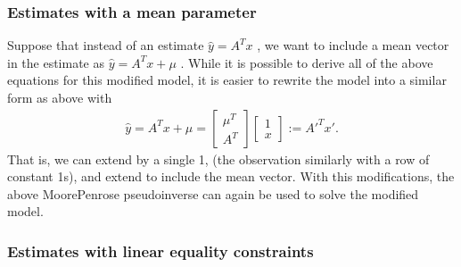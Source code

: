 \documentclass[letterpaper,10pt,english]{jupyterBook}
\begin{document}
\subsubsection{Estimates with a mean parameter}
\label{\detokenize{Modelling/Linear_regression:estimates-with-a-mean-parameter}}
\sphinxAtStartPar
Suppose that instead of an estimate \( \hat y=A^T x \) , we want to
include a mean vector in the estimate as \( \hat y=A^T x + \mu \) .
While it is possible to derive all of the above equations for this
modified model, it is easier to rewrite the model into a similar form as
above with
\begin{equation*}
\begin{split} \hat y=A^T x + \mu = \begin{bmatrix} \mu^T \\ A^T
\end{bmatrix} \begin{bmatrix} 1 \\ x \end{bmatrix} := A'^T x'. \end{split}
\end{equation*}
\sphinxAtStartPar
That is, we can extend  by a single 1, (the observation  similarly
with a row of constant 1s), and extend  to include the mean vector.
With this modifications, the above Moore\sphinxhyphen{}Penrose pseudo\sphinxhyphen{}inverse can
again be used to solve the modified model.


\subsubsection{Estimates with linear equality constraints}
\label{\detokenize{Modelling/Linear_regression:estimates-with-linear-equality-constraints}}
\sphinxAtStartPar
{}
\end{document}
